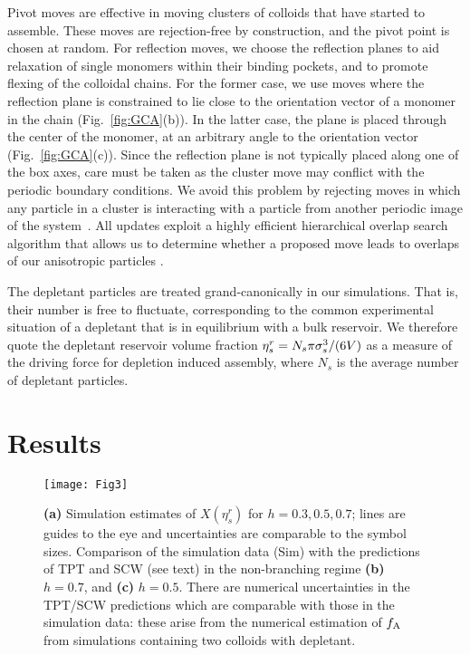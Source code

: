 \documentclass[10pt,onside,singlecolumn]{article}
\newcommand{\figurewidth}{0.95\textwidth}
\begin{document}
Pivot moves 
are  effective in
moving clusters of colloids that have started to assemble.
These moves are rejection-free by construction, and the pivot
point is chosen at random.
For reflection moves, we choose the reflection planes to
aid relaxation of single monomers within their binding pockets, and to
promote flexing of the colloidal chains.  For the former case, we use moves where 
the reflection plane is constrained to lie close to the orientation vector of a monomer in the
chain (Fig.~\ref{fig:GCA}(b)). In the latter case, the 
plane is placed through the center of the monomer,
at an arbitrary angle to the orientation vector (Fig.~\ref{fig:GCA}(c)). 
Since the reflection plane is not typically placed along
one of the box axes, care must be taken as the cluster move may
conflict with the periodic boundary conditions. We avoid this problem by rejecting moves in which
any particle in a cluster is interacting with a particle from another
periodic image of the system~\cite{sinkovits:144111}.
%  
All
updates exploit a highly efficient hierarchical overlap search
algorithm that allows us to determine whether a proposed move leads to
overlaps of our anisotropic particles
\cite{Marechal:2010fk,He:1990kx,Cinacchi:2010uq}.

The depletant particles are treated grand-canonically in our simulations.
That is, their number is free to fluctuate, corresponding to the
common experimental situation of a depletant that is in equilibrium
with a bulk reservoir.  We therefore quote the depletant reservoir
volume fraction $\eta_s^r=N_s\pi\sigma_s^3/(6V)$ as a measure of the
driving force for depletion induced assembly, where $N_s$ is the
average number of depletant particles.


\section{Results} \label{sec:results}

\begin{figure} 
  \texttt{[image: Fig3]}
\caption{{\bf (a)} Simulation estimates of $X(\eta_s^r)$ for
 $h=0.3,0.5,0.7$; lines are guides to the eye and uncertainties are
 comparable to the symbol sizes. Comparison of the simulation data (Sim)
 with the predictions of TPT and SCW (see text) in the non-branching regime {\bf (b)} $h=0.7$, and {\bf (c)} $h=0.5$.
 There are numerical uncertainties in the TPT/SCW predictions which are comparable with those in
 the simulation data: these arise from the numerical estimation
 of $f_{\rm A}$ from simulations containing two colloids with depletant.}
  \label{fig:X}
\end{figure}
\end{document}

